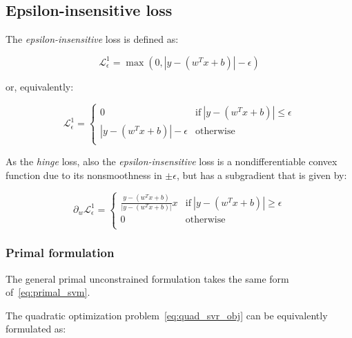 \pagebreak

\subsection{Epsilon-insensitive loss}

The \emph{epsilon-insensitive} loss is defined as:

\begin{equation} \label{eq:eps_loss1}
	\mathcal{L}_\epsilon^1 = \max(0, |y - (w^T x + b)| - \epsilon)
\end{equation}

or, equivalently:

\begin{equation} \label{eq:eps_loss2}
	\mathcal{L}_\epsilon^1 = 
	\begin{cases}
		0 & \text{if} \ |y - (w^T x + b)| \leq \epsilon \\
		|y - (w^T x + b)| - \epsilon & \text{otherwise} \\
	\end{cases}
\end{equation}

As the \emph{hinge} loss, also the \emph{epsilon-insensitive} loss is a nondifferentiable convex function due to its nonsmoothness in $\pm\epsilon$, but has a subgradient that is given by:


\begin{equation} \label{eq:eps_loss_der}
	\partial_w \mathcal{L}_\epsilon^1=
		\begin{cases}
            \displaystyle \frac{y - (w^T x + b)}{|y - (w^T x + b)|}x & \text{if} \ |y - (w^T x + b)| \geq \epsilon \\
            0 & \text{otherwise} \\ 
        \end{cases}
\end{equation}

\subsubsection{Primal formulation}

The general primal unconstrained formulation takes the same form of~\eqref{eq:primal_svm}.

The quadratic optimization problem~\eqref{eq:quad_svr_obj} can be equivalently formulated as:

